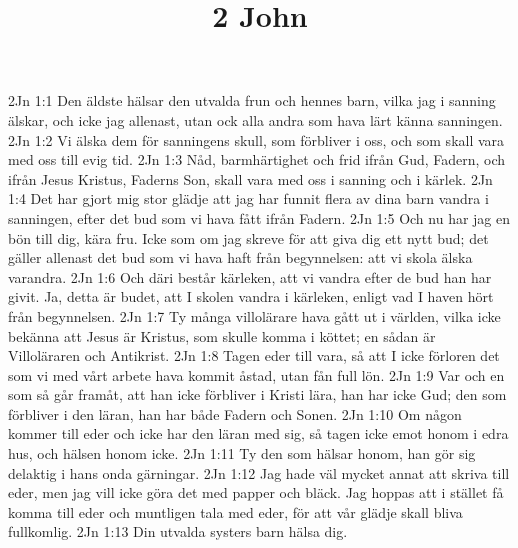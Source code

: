 

\title{2 John}

2Jn 1:1  Den äldste hälsar den utvalda frun och hennes barn, vilka jag i sanning älskar, och icke jag allenast, utan ock alla andra som hava lärt känna sanningen.
2Jn 1:2  Vi älska dem för sanningens skull, som förbliver i oss, och som skall vara med oss till evig tid.
2Jn 1:3  Nåd, barmhärtighet och frid ifrån Gud, Fadern, och ifrån Jesus Kristus, Faderns Son, skall vara med oss i sanning och i kärlek.
2Jn 1:4  Det har gjort mig stor glädje att jag har funnit flera av dina barn vandra i sanningen, efter det bud som vi hava fått ifrån Fadern.
2Jn 1:5  Och nu har jag en bön till dig, kära fru. Icke som om jag skreve för att giva dig ett nytt bud; det gäller allenast det bud som vi hava haft från begynnelsen: att vi skola älska varandra.
2Jn 1:6  Och däri består kärleken, att vi vandra efter de bud han har givit. Ja, detta är budet, att I skolen vandra i kärleken, enligt vad I haven hört från begynnelsen.
2Jn 1:7  Ty många villolärare hava gått ut i världen, vilka icke bekänna att Jesus är Kristus, som skulle komma i köttet; en sådan är Villoläraren och Antikrist.
2Jn 1:8  Tagen eder till vara, så att I icke förloren det som vi med vårt arbete hava kommit åstad, utan fån full lön.
2Jn 1:9  Var och en som så går framåt, att han icke förbliver i Kristi lära, han har icke Gud; den som förbliver i den läran, han har både Fadern och Sonen.
2Jn 1:10  Om någon kommer till eder och icke har den läran med sig, så tagen icke emot honom i edra hus, och hälsen honom icke.
2Jn 1:11  Ty den som hälsar honom, han gör sig delaktig i hans onda gärningar.
2Jn 1:12  Jag hade väl mycket annat att skriva till eder, men jag vill icke göra det med papper och bläck. Jag hoppas att i stället få komma till eder och muntligen tala med eder, för att vår glädje skall bliva fullkomlig.
2Jn 1:13  Din utvalda systers barn hälsa dig.


